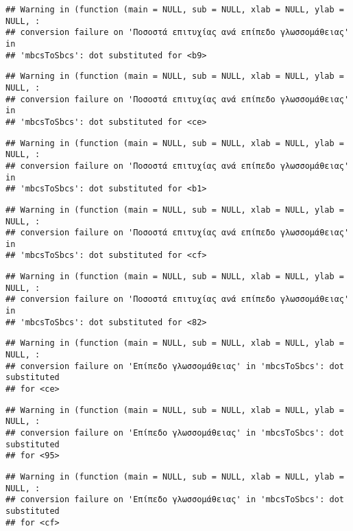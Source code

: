 \documentclass[
]{article}
\begin{document}
\begin{verbatim}
## Warning in (function (main = NULL, sub = NULL, xlab = NULL, ylab = NULL, :
## conversion failure on 'Ποσοστά επιτυχίας ανά επίπεδο γλωσσομάθειας' in
## 'mbcsToSbcs': dot substituted for <b9>
\end{verbatim}

\begin{verbatim}
## Warning in (function (main = NULL, sub = NULL, xlab = NULL, ylab = NULL, :
## conversion failure on 'Ποσοστά επιτυχίας ανά επίπεδο γλωσσομάθειας' in
## 'mbcsToSbcs': dot substituted for <ce>
\end{verbatim}

\begin{verbatim}
## Warning in (function (main = NULL, sub = NULL, xlab = NULL, ylab = NULL, :
## conversion failure on 'Ποσοστά επιτυχίας ανά επίπεδο γλωσσομάθειας' in
## 'mbcsToSbcs': dot substituted for <b1>
\end{verbatim}

\begin{verbatim}
## Warning in (function (main = NULL, sub = NULL, xlab = NULL, ylab = NULL, :
## conversion failure on 'Ποσοστά επιτυχίας ανά επίπεδο γλωσσομάθειας' in
## 'mbcsToSbcs': dot substituted for <cf>
\end{verbatim}

\begin{verbatim}
## Warning in (function (main = NULL, sub = NULL, xlab = NULL, ylab = NULL, :
## conversion failure on 'Ποσοστά επιτυχίας ανά επίπεδο γλωσσομάθειας' in
## 'mbcsToSbcs': dot substituted for <82>
\end{verbatim}

\begin{verbatim}
## Warning in (function (main = NULL, sub = NULL, xlab = NULL, ylab = NULL, :
## conversion failure on 'Επίπεδο γλωσσομάθειας' in 'mbcsToSbcs': dot substituted
## for <ce>
\end{verbatim}

\begin{verbatim}
## Warning in (function (main = NULL, sub = NULL, xlab = NULL, ylab = NULL, :
## conversion failure on 'Επίπεδο γλωσσομάθειας' in 'mbcsToSbcs': dot substituted
## for <95>
\end{verbatim}

\begin{verbatim}
## Warning in (function (main = NULL, sub = NULL, xlab = NULL, ylab = NULL, :
## conversion failure on 'Επίπεδο γλωσσομάθειας' in 'mbcsToSbcs': dot substituted
## for <cf>
\end{verbatim}
\end{document}

